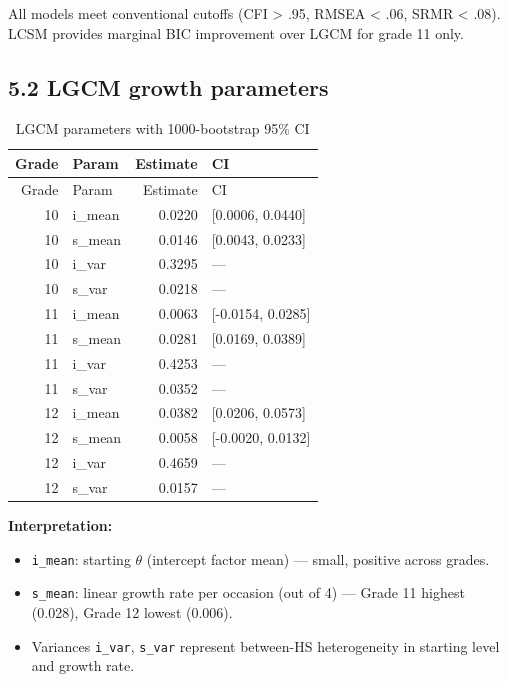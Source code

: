 \documentclass[
]{article}
\providecommand{\tightlist}{%
  \setlength{\itemsep}{0pt}\setlength{\parskip}{0pt}}
\begin{document}
All models meet conventional cutoffs (CFI \textgreater{} .95, RMSEA
\textless{} .06, SRMR \textless{} .08). LCSM provides marginal BIC
improvement over LGCM for grade 11 only.

\hypertarget{lgcm-growth-parameters}{%
\subsection{5.2 LGCM growth parameters}\label{lgcm-growth-parameters}}

\begin{longtable}[]{@{}rlrl@{}}
\caption{LGCM parameters with 1000-bootstrap 95\% CI}\tabularnewline
\toprule
Grade & Param & Estimate & CI \\
\midrule
\endfirsthead
\toprule
Grade & Param & Estimate & CI \\
\midrule
\endhead
10 & i\_mean & 0.0220 & {[}0.0006, 0.0440{]} \\
10 & s\_mean & 0.0146 & {[}0.0043, 0.0233{]} \\
10 & i\_var & 0.3295 & --- \\
10 & s\_var & 0.0218 & --- \\
11 & i\_mean & 0.0063 & {[}-0.0154, 0.0285{]} \\
11 & s\_mean & 0.0281 & {[}0.0169, 0.0389{]} \\
11 & i\_var & 0.4253 & --- \\
11 & s\_var & 0.0352 & --- \\
12 & i\_mean & 0.0382 & {[}0.0206, 0.0573{]} \\
12 & s\_mean & 0.0058 & {[}-0.0020, 0.0132{]} \\
12 & i\_var & 0.4659 & --- \\
12 & s\_var & 0.0157 & --- \\
\bottomrule
\end{longtable}

\textbf{Interpretation:}

\begin{itemize}
\tightlist
\item
  \texttt{i\_mean}: starting \(\theta\) (intercept factor mean) ---
  small, positive across grades.
\item
  \texttt{s\_mean}: linear growth rate per occasion (out of 4) --- Grade
  11 highest (0.028), Grade 12 lowest (0.006).
\item
  Variances \texttt{i\_var}, \texttt{s\_var} represent between-HS
  heterogeneity in starting level and growth rate.
\end{itemize}
\end{document}
